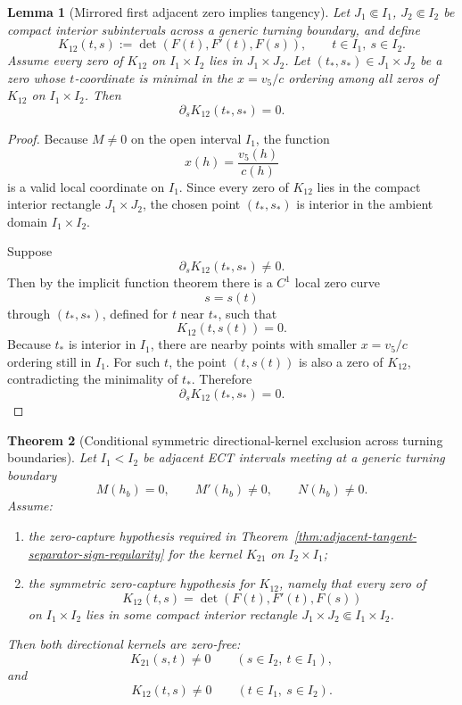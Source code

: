 \documentclass[11pt,a4paper]{amsart}
\theoremstyle{plain}
\newtheorem{theorem}{Theorem}[section]
\newtheorem{lemma}[theorem]{Lemma}
\theoremstyle{definition}
\begin{document}
\begin{lemma}[Mirrored first adjacent zero implies tangency]
\label{lem:mirrored-first-adjacent-zero-implies-tangency}
Let $J_1\Subset I_1$, $J_2\Subset I_2$ be compact interior subintervals
across a generic turning boundary, and define
\[
K_{12}(t,s):=\det(F(t),F'(t),F(s)),
\qquad
t\in I_1,\ s\in I_2.
\]
Assume every zero of $K_{12}$ on $I_1\times I_2$ lies in
$J_1\times J_2$. Let $(t_*,s_*)\in J_1\times J_2$ be a zero whose
$t$-coordinate is minimal in the $x=v_5/c$ ordering among all zeros of
$K_{12}$ on $I_1\times I_2$. Then
\[
\partial_s K_{12}(t_*,s_*)=0.
\]
\end{lemma}

\begin{proof}
Because $M\neq 0$ on the open interval $I_1$, the function
\[
x(h)=\frac{v_5(h)}{c(h)}
\]
is a valid local coordinate on $I_1$. Since every zero of $K_{12}$ lies in
the compact interior rectangle $J_1\times J_2$, the chosen point
$(t_*,s_*)$ is interior in the ambient domain $I_1\times I_2$.

Suppose
\[
\partial_s K_{12}(t_*,s_*)\neq 0.
\]
Then by the implicit function theorem there is a $C^1$ local zero curve
\[
s=s(t)
\]
through $(t_*,s_*)$, defined for $t$ near $t_*$, such that
\[
K_{12}(t,s(t))=0.
\]
Because $t_*$ is interior in $I_1$, there are nearby points with smaller
$x=v_5/c$ ordering still in $I_1$. For such $t$, the point
$(t,s(t))$ is also a zero of $K_{12}$, contradicting the minimality of
$t_*$. Therefore
\[
\partial_s K_{12}(t_*,s_*)=0.
\]
\end{proof}

\begin{theorem}[Conditional symmetric directional-kernel exclusion across turning boundaries]
\label{thm:conditional-symmetric-directional-kernel-exclusion}
Let $I_1<I_2$ be adjacent ECT intervals meeting at a generic turning boundary
\[
M(h_b)=0,\qquad M'(h_b)\neq 0,\qquad N(h_b)\neq 0.
\]
Assume:
\begin{enumerate}
\item the zero-capture hypothesis required in
Theorem~\ref{thm:adjacent-tangent-separator-sign-regularity} for the kernel
$K_{21}$ on $I_2\times I_1$;
\item the symmetric zero-capture hypothesis for $K_{12}$, namely that every
zero of
\[
K_{12}(t,s)=\det(F(t),F'(t),F(s))
\]
on $I_1\times I_2$ lies in some compact interior rectangle
$J_1\times J_2\Subset I_1\times I_2$.
\end{enumerate}
Then both directional kernels are zero-free:
\[
K_{21}(s,t)\neq 0
\qquad (s\in I_2,\ t\in I_1),
\]
and
\[
K_{12}(t,s)\neq 0
\qquad (t\in I_1,\ s\in I_2).
\]
\end{theorem}
\end{document}
